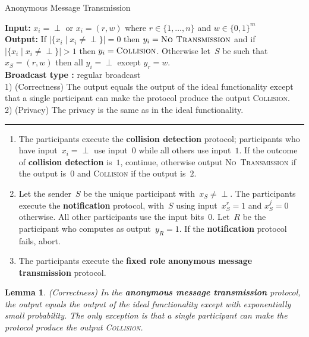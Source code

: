 \documentclass[11pt]{article}
\newtheorem{lemma}[theorem]{Lemma}
\begin{document}
\begin{protocol}
\caption{Anonymous Message Transmission}
\label{prot:anon-mess-trans}
{\bf Input:} $x_i=\perp$ or $x_i = (r,w)$ where $r \in \{1,\ldots,n\}$ and  $w \in \{0,1\}^m$ \\
{\bf Output:} If $|\{x_i \mid x_i \neq  \perp \}|=0$ then
$y_i=\textsc{No~Transmission}$ and if $|\{x_i \mid x_i \neq  \perp
\}|>1$
 then $y_i=\textsc{Collision}$. Otherwise let~$S$ be such that $x_S=(r,w)$ then all $y_i=\perp$ except $y_r=w$. \\
{\bf Broadcast type :}  regular broadcast \\
1) (Correctness) The output equals the output of the ideal
functionality except that a single participant can make the protocol produce the output \textsc{Collision}.\\
2) (Privacy) The privacy is the same as in the ideal functionality.

\vspace{4pt} \hrule \vspace{4pt}


\begin{enumerate}
\item The participants execute the \textbf{collision detection} protocol; participants who have input~\mbox{$x_i
=\perp$} use input~$0$ while all others use input~$1$. If the
outcome of \textbf{collision detection} is~$1$, continue, otherwise
output \textsc{No~Transmission} if the output is~$0$ and
\textsc{Collision} if the output is~$2$.

\item \label{anon-mess-trans-step-2} Let the sender~$S$ be the unique participant with~$x_S \neq
\perp$. The participants execute the \textbf{notification} protocol,
with~$S$ using input~$x_S^r =1$ and $x_S^j=0$ otherwise. All other
participants use the input bits~$0$. Let~$R$ be the participant who
computes as output~$y_R = 1$. If the \textbf{notification} protocol
fails, abort.

\item The participants execute the \textbf{fixed role anonymous message transmission}
protocol.

\end{enumerate}

\end{protocol}

\begin{lemma}(Correctness)
In the \textbf{anonymous message transmission} protocol, the output
equals the output of the ideal functionality except with
exponentially small probability. The only exception is  that a
single participant can make the protocol produce the output
\textsc{Collision}.
\end{lemma}
\end{document}
